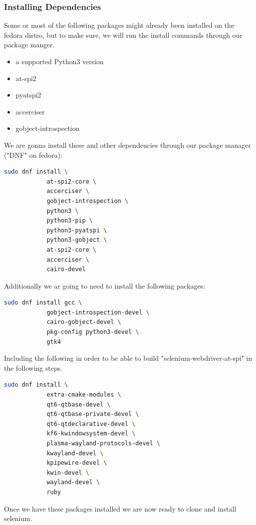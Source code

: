\documentclass{article}
\begin{document}
        \subsubsection{Installing Dependencies}
        Some or most of the following packages might already been installed on 
        the fedora distro, but to make sure, we will run the install commands 
        through our package manger.
        \begin{itemize}
            \item a supported Python3 version
            \item at-spi2
            \item pyatspi2
            \item accerciser
            \item gobject-introspection
        \end{itemize}
        We are gonna install these and other dependencies through our package 
        manager ("DNF" on fedora):
        \begin{lstlisting}[language=bash]
            sudo dnf install \
            at-spi2-core \
            accerciser \
            gobject-introspection \
            python3 \
            python3-pip \
            python3-pyatspi \
            python3-gobject \
            at-spi2-core \
            accerciser \
            cairo-devel
        \end{lstlisting}
        Additionally we ar going to need to install the following packages:
        \begin{lstlisting}[language=bash]
            sudo dnf install gcc \
            gobject-introspection-devel \
            cairo-gobject-devel \
            pkg-config python3-devel \
            gtk4
        \end{lstlisting}
        Including the following in order to be able to build 
        "selenium-webdriver-at-spi" in the following steps.
        \begin{lstlisting}[language=bash]
            sudo dnf install \
            extra-cmake-modules \
            qt6-qtbase-devel \
            qt6-qtbase-private-devel \
            qt6-qtdeclarative-devel \
            kf6-kwindowsystem-devel \
            plasma-wayland-protocols-devel \
            kwayland-devel \
            kpipewire-devel \
            kwin-devel \
            wayland-devel \
            ruby
        \end{lstlisting}
        Once we have these packages installed we are now ready to clone and 
        install selenium.
\end{document}
